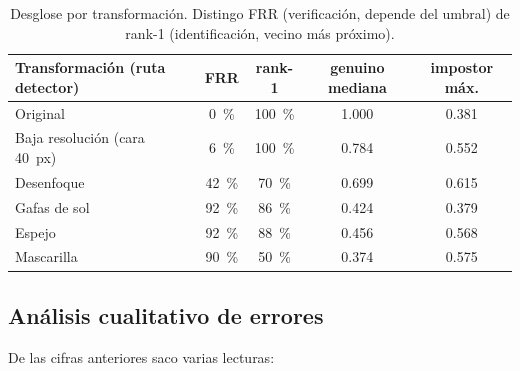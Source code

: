 \documentclass[11pt,a4paper]{article}
\begin{document}
\begin{table}[h]
\centering\small
\begin{tabular}{@{}lcccc@{}}
\toprule
\textbf{Transformación (ruta detector)} & \textbf{FRR} & \textbf{rank-1} & \textbf{genuino mediana} & \textbf{impostor máx.} \\
\midrule
Original                 & \SI{0}{\percent}   & \SI{100}{\percent} & 1.000 & 0.381 \\
Baja resolución (cara \SI{40}{px}) & \SI{6}{\percent}  & \SI{100}{\percent} & 0.784 & 0.552 \\
Desenfoque               & \SI{42}{\percent}  & \SI{70}{\percent}  & 0.699 & 0.615 \\
Gafas de sol             & \SI{92}{\percent}  & \SI{86}{\percent}  & 0.424 & 0.379 \\
Espejo                   & \SI{92}{\percent}  & \SI{88}{\percent}  & 0.456 & 0.568 \\
Mascarilla               & \SI{90}{\percent}  & \SI{50}{\percent}  & 0.374 & 0.575 \\
\bottomrule
\end{tabular}
\caption{Desglose por transformación. Distingo FRR (verificación, depende del umbral) de
rank-1 (identificación, vecino más próximo).}
\label{tab:aum}
\end{table}

\subsection{Análisis cualitativo de errores}

De las cifras anteriores saco varias lecturas:
\end{document}

